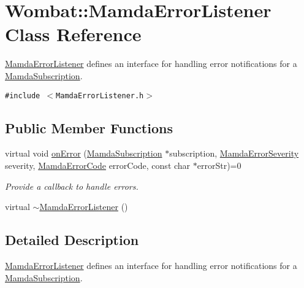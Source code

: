 \hypertarget{classWombat_1_1MamdaErrorListener}{
\section{Wombat::Mamda\-Error\-Listener Class Reference}
\label{classWombat_1_1MamdaErrorListener}
}
\hyperlink{classWombat_1_1MamdaErrorListener}{Mamda\-Error\-Listener} defines an interface for handling error notifications for a \hyperlink{classWombat_1_1MamdaSubscription}{Mamda\-Subscription}.  


{\tt \#include $<$Mamda\-Error\-Listener.h$>$}

\subsection*{Public Member Functions}
\begin{CompactItemize}
\item 
virtual void \hyperlink{classWombat_1_1MamdaErrorListener_415a2478c568c6b5e5e8d5d8ef7b40ee}{on\-Error} (\hyperlink{classWombat_1_1MamdaSubscription}{Mamda\-Subscription} $\ast$subscription, \hyperlink{namespaceWombat_10f0aa05514c69e0d8e360af40278c8c}{Mamda\-Error\-Severity} severity, \hyperlink{namespaceWombat_0bef5aac9df8b606704a54a376f45597}{Mamda\-Error\-Code} error\-Code, const char $\ast$error\-Str)=0
\begin{CompactList}\small\item\em Provide a callback to handle errors. \item\end{CompactList}\item 
virtual \hyperlink{classWombat_1_1MamdaErrorListener_dbe5538f6b7c44630de95268e597aa68}{$\sim$Mamda\-Error\-Listener} ()
\end{CompactItemize}


\subsection{Detailed Description}
\hyperlink{classWombat_1_1MamdaErrorListener}{Mamda\-Error\-Listener} defines an interface for handling error notifications for a \hyperlink{classWombat_1_1MamdaSubscription}{Mamda\-Subscription}. 



